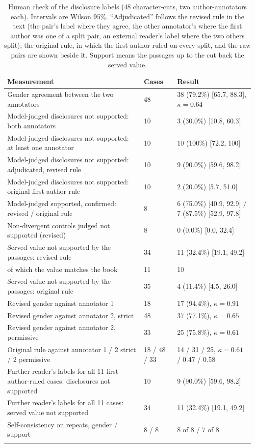 \documentclass[sn-mathphys]{sn-jnl}%
\theoremstyle{thmstyleone}%
\theoremstyle{thmstyletwo}%
\theoremstyle{thmstylethree}%
\begin{document}
\begin{table}[!t]
\caption{Human check of the disclosure labels (48 character-cuts, two author-annotators each). Intervals are Wilson 95\%. ``Adjudicated'' follows the revised rule in the text (the pair's label where they agree, the other annotator's where the first author was one of a split pair, an external reader's label where the two others split); the original rule, in which the first author ruled on every split, and the raw pairs are shown beside it. Support means the passages up to the cut back the served value.}\label{tab:human_pipeline}
\footnotesize
\begin{tabular*}{\textwidth}{@{\extracolsep\fill}p{6.3cm}p{1.5cm}p{4.0cm}}
\toprule
Measurement & Cases & Result \\
\midrule
Gender agreement between the two annotators & 48 & 38 (79.2\%) [65.7, 88.3], $\kappa=0.64$ \\
Model-judged disclosures not supported: both annotators & 10 & 3 (30.0\%) [10.8, 60.3] \\
Model-judged disclosures not supported: at least one annotator & 10 & 10 (100\%) [72.2, 100] \\
Model-judged disclosures not supported: adjudicated, revised rule & 10 & 9 (90.0\%) [59.6, 98.2] \\
Model-judged disclosures not supported: original first-author rule & 10 & 2 (20.0\%) [5.7, 51.0] \\
Model-judged supported, confirmed: revised / original rule & 8 & 6 (75.0\%) [40.9, 92.9] / 7 (87.5\%) [52.9, 97.8] \\
Non-divergent controls judged not supported (revised) & 8 & 0 (0.0\%) [0.0, 32.4] \\
Served value not supported by the passages: revised rule & 34 & 11 (32.4\%) [19.1, 49.2] \\
\quad of which the value matches the book & 11 & 10 \\
Served value not supported by the passages: original rule & 35 & 4 (11.4\%) [4.5, 26.0] \\
Revised gender against annotator 1 & 18 & 17 (94.4\%), $\kappa=0.91$ \\
Revised gender against annotator 2, strict & 48 & 37 (77.1\%), $\kappa=0.65$ \\
Revised gender against annotator 2, permissive & 33 & 25 (75.8\%), $\kappa=0.61$ \\
Original rule against annotator 1 / 2 strict / 2 permissive & 18 / 48 / 33 & 14 / 31 / 25, $\kappa=0.61$ / 0.47 / 0.58 \\
Further reader's labels for all 11 first-author-ruled cases: disclosures not supported & 10 & 9 (90.0\%) [59.6, 98.2] \\
Further reader's labels for all 11 cases: served value not supported & 34 & 11 (32.4\%) [19.1, 49.2] \\
Self-consistency on repeats, gender / support & 8 / 8 & 8 of 8 / 7 of 8 \\
\botrule
\end{tabular*}
\end{table}
\end{document}
